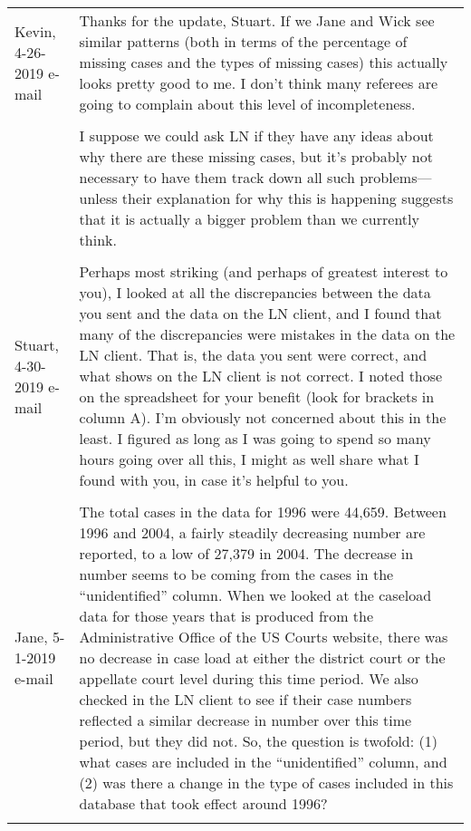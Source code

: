 \documentclass[10pt, letterpaper]{article}
\begin{document}
\begin{spacing}{1.0}
\begin{longtable}{p{1.5in}p{5in}}
    Kevin, 4-26-2019 e-mail & Thanks for the update, Stuart. If we Jane and Wick see similar patterns (both in terms of the percentage of missing cases and the types of missing cases) this actually looks pretty good to me. I don’t think many referees are going to complain about this level of incompleteness. \\\\
    
    & I suppose we could ask LN if they have any ideas about why there are these missing cases, but it’s probably not necessary to have them track down all such problems— unless their explanation for why this is happening suggests that it is actually a bigger problem than we currently think.\\\\
    
    
    
    Stuart, 4-30-2019 e-mail & Perhaps most striking (and perhaps of greatest interest to you), I looked at all the discrepancies between the data you sent and the data on the LN client, and I found that many of the discrepancies were mistakes in the data on the LN client. That is, the data you sent were correct, and what shows on the LN client is not correct. I noted those on the spreadsheet for your benefit (look for brackets in column A). I’m obviously not concerned about this in the least. I figured as long as I was going to spend so many hours going over all this, I might as well share what I found with you, in case it’s helpful to you.\\\\
    
    
    
    Jane, 5-1-2019 e-mail & The total cases in the data for 1996 were 44,659. Between 1996 and 2004, a fairly steadily decreasing number are reported, to a low of 27,379 in 2004. The decrease in number seems to be coming from the cases in the ``unidentified” column. When we looked at the caseload data for those years that is produced from the Administrative Office of the US Courts website, there was no decrease in case load at either the district court or the appellate court level during this time period. We also checked in the LN client to see if their case numbers reflected a similar decrease in number over this time period, but they did not. So, the question is twofold: (1) what cases are included in the “unidentified” column, and (2) was there a change in the type of cases included in this database that took effect around 1996?\\\\
    

\end{longtable}
\end{spacing}
\end{document}
